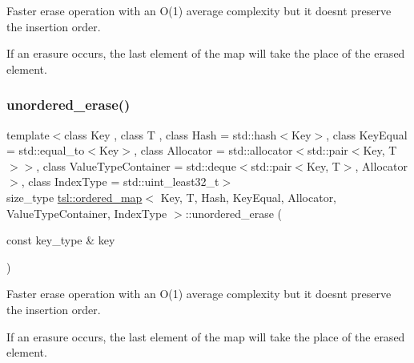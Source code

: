 Faster erase operation with an O(1) average complexity but it doesn\textquotesingle{}t preserve the insertion order.

If an erasure occurs, the last element of the map will take the place of the erased element. \mbox{\label{classtsl_1_1ordered__map_a1f070a35cdd7c62946f24d2fc122db35}} 
\subsubsection{\texorpdfstring{unordered\_erase()}{unordered\_erase()}\hspace{0.1cm}{\footnotesize\ttfamily [3/6]}}
{\footnotesize\ttfamily template$<$class Key , class T , class Hash  = std\+::hash$<$\+Key$>$, class Key\+Equal  = std\+::equal\+\_\+to$<$\+Key$>$, class Allocator  = std\+::allocator$<$std\+::pair$<$\+Key, T$>$$>$, class Value\+Type\+Container  = std\+::deque$<$std\+::pair$<$\+Key, T$>$, Allocator$>$, class Index\+Type  = std\+::uint\+\_\+least32\+\_\+t$>$ \\
size\+\_\+type \mbox{\hyperlink{classtsl_1_1ordered__map}{tsl\+::ordered\+\_\+map}}$<$ Key, T, Hash, Key\+Equal, Allocator, Value\+Type\+Container, Index\+Type $>$\+::unordered\+\_\+erase (\begin{DoxyParamCaption}\item[{const key\+\_\+type \&}]{key }\end{DoxyParamCaption})\hspace{0.3cm}{\ttfamily [inline]}}





Faster erase operation with an O(1) average complexity but it doesn\textquotesingle{}t preserve the insertion order.

If an erasure occurs, the last element of the map will take the place of the erased element. \mbox{\label{classtsl_1_1ordered__map_a482e931c4125adb155005ee38b0ceda4}} 
